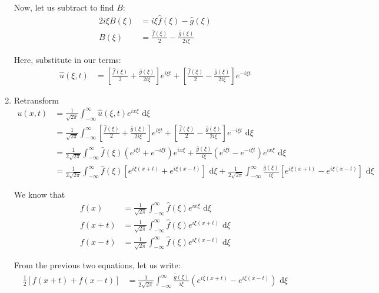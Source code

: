 \begin{enumerate}
  Now, let us subtract to find $B$:
  \begin{align}
    2 i \xi B(\xi) & = i \xi \hat f (\xi) - \hat g (\xi)\\
    B(\xi) & = \frac{\hat f(\xi)}{2} - \frac{\hat g(\xi)}{2 i \xi}
  \end{align}

  Here, substitute in our terms:
  \begin{align}
    \hat u(\xi, t)
    & = \left[ \frac{\hat f(\xi)}{2} + \frac{\hat g(\xi)}{2 i \xi}  \right] e^{i \xi t} + \left[ \frac{\hat f(\xi)}{2} - \frac{\hat g(\xi)}{2 i \xi} \right] e^{-i \xi t}
  \end{align}

  \item Retransform
  \begin{align}
    u(x, t)
    & = \frac{1}{\sqrt{2 \pi}} \int^\infty_{-\infty} \hat u(\xi, t) e^{i x \xi} \text{ d}\xi\\
    & = \frac{1}{\sqrt{2 \pi}} \int^\infty_{-\infty} \left[ \frac{\hat f(\xi)}{2} + \frac{\hat g(\xi)}{2 i \xi}  \right] e^{i \xi t} + \left[ \frac{\hat f(\xi)}{2} - \frac{\hat g(\xi)}{2 i \xi} \right] e^{-i \xi t} \text{ d}\xi\\
    & =
    \frac{1}{2 \sqrt{2 \pi}} \int^\infty_{-\infty}
    \hat f(\xi)
    \left(e^{i \xi t} + e^{-i \xi t}\right)e^{i x \xi} +
    \frac{\hat g(\xi)}{i \xi}
    \left( e^{i \xi t} - e^{-i \xi t} \right)e^{i x \xi} \text{ d}\xi\\
    & =
    \frac{1}{2 \sqrt{2 \pi}} \int^\infty_{-\infty}
    \hat f(\xi) \left[ e^{i \xi(x + t)} + e^{i \xi(x - t)} \right] \text{ d}\xi
    + \frac{1}{2 \sqrt{2 \pi}} \int^\infty_{-\infty}
    \frac{\hat g(\xi)}{i \xi}
    \left[ e^{i \xi(x + t)} - e^{i \xi(x - t)} \right] \text{ d}\xi
  \end{align}

  We know that
  \begin{align}
    f(x) & = \frac{1}{\sqrt{2 \pi}} \int^\infty_{-\infty} \hat f(\xi) e^{i x \xi} \text{ d}\xi\\
    f(x + t) & = \frac{1}{\sqrt{2 \pi}} \int^\infty_{-\infty} \hat f(\xi) e^{i \xi(x + t)} \text{ d}\xi\\
    f(x - t) & = \frac{1}{\sqrt{2 \pi}} \int^\infty_{-\infty} \hat f(\xi) e^{i \xi(x - t)} \text{ d}\xi
  \end{align}

  From the previous two equations, let us write:
  \begin{align}
    \frac{1}{2} \left[ f(x + t) + f(x - t) \right]
    & = %
    \frac{1}{2 \sqrt{2 \pi}} \int^\infty_{-\infty} \frac{\hat g(\xi)}{i \xi} \left( e^{i \xi(x + t)} - e^{i \xi(x - t)} \right) \text{ d}\xi
  \end{align}


\end{enumerate}

